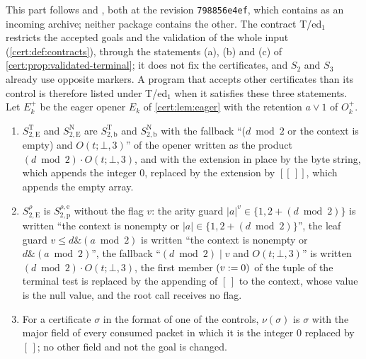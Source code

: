 This part follows  and , both
at the revision \texttt{798856e4ef}, which contains 
as an incoming archive; neither package contains the other. The contract T/ed$_1$
restricts the accepted goals and the validation of the whole input
(\cref{cert:def:contracts}), through the statements (a), (b) and (c) of
\cref{cert:prop:validated-terminal}; it does not fix the certificates, and $S_2$ and
$S_3$ already use opposite markers. A program that accepts other certificates than
its control is therefore listed under T/ed$_1$ when it satisfies these three
statements. Let $E^{+}_k$ be the eager opener $E_k$ of \cref{cert:lem:eager} with
the retention $a\lor 1$ of $O^{+}_k$.
\begin{enumerate}[label=(\roman*)]
\item $S^{\mathrm T}_{2,\mathrm E}$ and $S^{\mathrm N}_{2,\mathrm E}$ are
$S^{\mathrm T}_{2,\mathrm b}$ and $S^{\mathrm N}_{2,\mathrm b}$ with the fallback
``($d\bmod 2$ or the context is empty) and $O(t;\bot,3)$'' of the opener written as
the product $(d\bmod 2)\cdot O(t;\bot,3)$, and with the extension in place by the
byte string, which appends the integer $0$, replaced by the extension by $[[\,]]$,
which appends the empty array.
\item $S^{\rho}_{2,\mathrm E}$ is $S^{\rho,\mathrm e}_{2,\mathrm p}$ without the flag
$v$: the arity guard $\lvert a\rvert^{v}\in\{1,2+(d\bmod 2)\}$ is written ``the
context is nonempty or $\lvert a\rvert\in\{1,2+(d\bmod 2)\}$'', the leaf guard
$v\le d\mathbin{\&}(a\bmod 2)$ is written ``the context is nonempty or
$d\mathbin{\&}(a\bmod 2)$'', the fallback ``$(d\bmod 2)\mathbin{|}v$ and
$O(t;\bot,3)$'' is written $(d\bmod 2)\cdot O(t;\bot,3)$, the first member
$(v\mathrel{:=} 0)$ of the tuple of the terminal test is replaced by the appending of
$[\,]$ to the context, whose value is the null value, and the root call receives
no flag.
\item For a certificate $\sigma$ in the format of one of the controls,
$\nu(\sigma)$ is $\sigma$ with the major field of every consumed packet in which
it is the integer $0$ replaced by $[\,]$; no other field and not the goal is
changed.
\end{enumerate}

